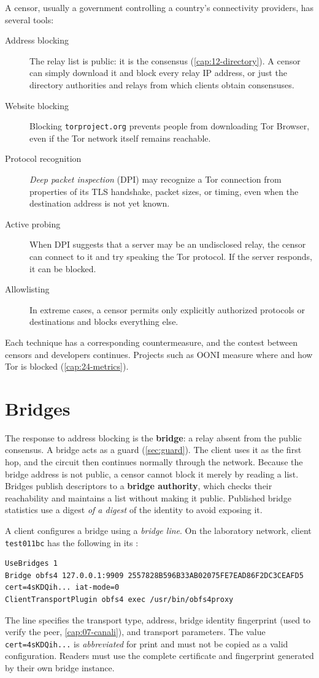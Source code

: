 A censor, usually a government controlling a country's connectivity providers, has several tools:
\begin{description}
  \item[Address blocking] The relay list is public: it is the consensus (\cref{cap:12-directory}). A censor can simply download it and block every relay IP address, or just the directory authorities and relays from which clients obtain consensuses.
  \item[Website blocking] Blocking \texttt{torproject.org} prevents people from downloading Tor Browser, even if the Tor network itself remains reachable.
  \item[Protocol recognition] \emph{Deep packet inspection} (DPI) may recognize a Tor connection from properties of its TLS handshake, packet sizes, or timing, even when the destination address is not yet known.
  \item[Active probing] When DPI suggests that a server may be an undisclosed relay, the censor can connect to it and try speaking the Tor protocol. If the server responds, it can be blocked.
  \item[Allowlisting] In extreme cases, a censor permits only explicitly authorized protocols or destinations and blocks everything else.
\end{description}
Each technique has a corresponding countermeasure, and the contest between censors and developers continues. Projects such as OONI measure where and how Tor is blocked (\cref{cap:24-metrics}).

\section{Bridges}\label{sec:cens-bridge}

The response to address blocking is the \textbf{bridge}: a relay absent from the public consensus. A bridge acts as a guard (\cref{sec:guard}). The client uses it as the first hop, and the circuit then continues normally through the network. Because the bridge address is not public, a censor cannot block it merely by reading a list. Bridges publish descriptors to a \textbf{bridge authority}, which checks their reachability and maintains a list without making it public. Published bridge statistics use a digest \emph{of a digest} of the identity to avoid exposing it.

A client configures a bridge using a \emph{bridge line}. On the laboratory network, client \texttt{test011bc} has the following in its :
\begin{lstlisting}[language=torrc,numbers=none]
UseBridges 1
Bridge obfs4 127.0.0.1:9909 2557828B596B33AB02075FE7EAD86F2DC3CEAFD5 cert=4sKDQih... iat-mode=0
ClientTransportPlugin obfs4 exec /usr/bin/obfs4proxy
\end{lstlisting}
The line specifies the transport type, address, bridge identity fingerprint (used to verify the peer, \cref{cap:07-canali}), and transport parameters. The value \texttt{cert=4sKDQih...} is \emph{abbreviated} for print and must not be copied as a valid configuration. Readers must use the complete certificate and fingerprint generated by their own bridge instance.

